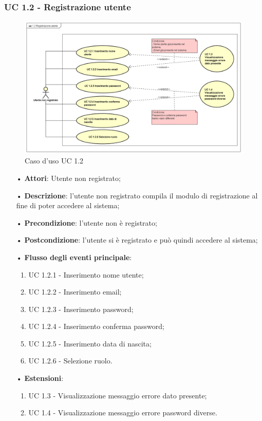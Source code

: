 \subsubsection{UC 1.2 - Registrazione utente}
\begin{figure}[H]
	\centering
	\includegraphics[width=17cm]{img/UC12.png} 
	\caption{Caso d'uso UC 1.2}\label{fig:12}
\end{figure}
\begin{itemize}
	\item[•]\textbf{Attori}: Utente non registrato;
	\item[•]\textbf{Descrizione}: l'utente non registrato compila il modulo di registrazione al fine di poter accedere al sistema;
	\item[•]\textbf{Precondizione}: l'utente non è registrato;
	\item[•]\textbf{Postcondizione}: l'utente si è registrato e può quindi accedere al sistema;
	\item[•]\textbf{Flusso degli eventi principale}:
	\begin{enumerate}
		\item UC 1.2.1 - Inserimento nome utente;
		\item UC 1.2.2 - Inserimento email;
		\item UC 1.2.3 - Inserimento password;
		\item UC 1.2.4 - Inserimento conferma password;
		\item UC 1.2.5 - Inserimento data di nascita;
		\item UC 1.2.6 - Selezione ruolo.
	\end{enumerate}
	\item[•]\textbf{Estensioni}:
	\begin{enumerate}
		\item UC 1.3 - Visualizzazione messaggio errore dato presente;
		\item UC 1.4 - Visualizzazione messaggio errore password diverse.
	\end{enumerate}
\end{itemize}


